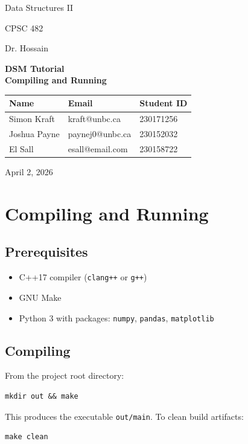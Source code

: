 \documentclass[12pt]{article}
\begin{document}
\begin{titlepage}
	\centering
	\vspace*{2.0cm}
	{\LARGE{Data Structures II}\par}
	\vspace{0.5cm}
	{\large CPSC 482 \par}
	\vspace{0.5cm}
	{\large Dr. Hossain \par}
	\vspace{1.5cm}
	{\huge\bfseries DSM Tutorial \\ Compiling and Running \par}
	\vspace{1cm}
	\begin{tabular}{lll}
		\toprule
		\textbf{Name} & \textbf{Email}  & \textbf{Student ID} \\
		\midrule
		Simon Kraft   & kraft@unbc.ca   & 230171256           \\
		Joshua Payne  & paynej0@unbc.ca & 230152032           \\
		El Sall       & esall@email.com & 230158722           \\
		\bottomrule
	\end{tabular}
	\vspace{1cm}

	{\Large April 2, 2026}
\end{titlepage}

\section*{Compiling and Running}

\subsection*{Prerequisites}
\begin{itemize}
	\item C++17 compiler (\texttt{clang++} or \texttt{g++})
	\item GNU Make
	\item Python 3 with packages: \texttt{numpy}, \texttt{pandas}, \texttt{matplotlib}
\end{itemize}

\subsection*{Compiling}
From the project root directory:
\begin{lstlisting}
mkdir out && make
\end{lstlisting}
This produces the executable \texttt{out/main}. To clean build artifacts:
\begin{lstlisting}
make clean
\end{lstlisting}
\end{document}
